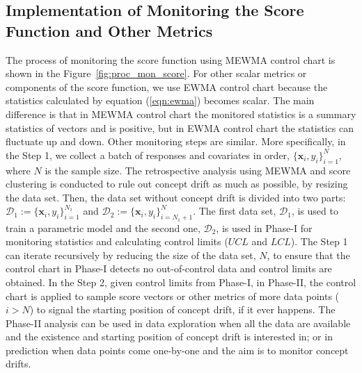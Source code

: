 \documentclass[twoside,11pt]{article}
\begin{document}
\subsection{Implementation of Monitoring the Score Function and Other Metrics}
\label{ss:imp_score_method}
The process of monitoring the score function using MEWMA control chart is shown in the Figure~\ref{fig:proc_mon_score}. For other scalar metrics or components of the score function, we use EWMA control chart because the statistics calculated by equation (\ref{eqn:ewma}) becomes scalar. The main difference is that in MEWMA control chart the monitored statistics is a summary statistics of vectors and is positive, but in EWMA control chart the statistics can fluctuate up and down. Other monitoring steps are similar. More specifically, in the Step 1, we collect a batch of responses and covariates in order, $\{\bm {x}_i, y_i\} _{i=1} ^{N}$, where $N$ is the sample size. The retrospective analysis using MEWMA and score clustering is conducted to rule out concept drift as much as possible, by resizing the data set. Then, the data set without concept drift is divided into two parts: $ \mathcal{D}_1 := \{\bm {x}_i, y_i\} _{i=1} ^{N_1}$ and $\mathcal{D}_2 := \{\bm {x}_i, y_i\} _{i=N_1+1} ^{N}$. The first data set, $\mathcal{D}_1$, is used to train a parametric model and the second one, $\mathcal{D}_2$, is used in Phase-I for monitoring statistics and calculating control limits ($UCL$ and $LCL$). The Step 1 can iterate recursively by reducing the size of the data set, $N$, to ensure that the control chart in Phase-I detects no out-of-control data and control limits are obtained. In the Step 2, given control limits from Phase-I, in Phase-II, the control chart is applied to sample score vectors or other metrics of more data points ($i > N$) to signal the starting position of concept drift, if it ever happens. The Phase-II analysis can be used in data exploration when all the data are available and the existence and starting position of concept drift is interested in; or in prediction when data points come one-by-one and the aim is to monitor concept drifts. 
\end{document}
